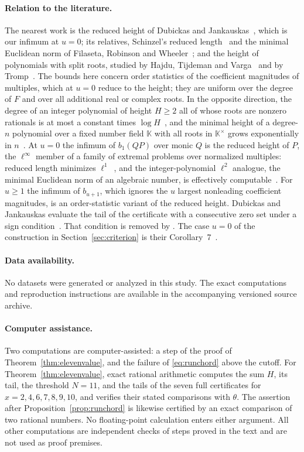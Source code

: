 \documentclass[11pt]{article}
\theoremstyle{definition}
\theoremstyle{plain}
\begin{document}
\paragraph{Relation to the literature.}  The nearest work is the reduced
height of Dubickas and Jankauskas~\cite{dj}, which is our infimum at $u=0$;
its relatives, Schinzel's reduced length~\cite{schinzel} and the minimal
Euclidean norm of Filaseta, Robinson and Wheeler~\cite{frw}; and the height
of polynomials with split roots, studied by Hajdu, Tijdeman and
Varga~\cite{htv} and by Tromp~\cite{tromp}.  The bounds here concern order
statistics of the coefficient magnitudes of multiples, which at $u=0$ reduce
to the height; they are uniform over the degree
of $F$ and over all additional real or complex roots.  In the opposite
direction, the degree of an integer polynomial of height $H\ge2$ all of whose
roots are nonzero rationals is at most a constant times $\log H$~\cite{htv},
and the minimal height of a degree-$n$ polynomial over a fixed number
field $\mathbb K$ with all roots in $\mathbb K^\times$ grows exponentially in
$n$~\cite{tromp}.  At $u=0$ the infimum of $b_1(QP)$ over monic $Q$ is the reduced height of $P$,
the $\ell^\infty$ member of a family
of extremal problems over normalized multiples: reduced length minimizes
$\ell^1$~\cite{schinzel}, and the integer-polynomial $\ell^2$ analogue, the
minimal Euclidean norm of an algebraic number, is effectively
computable~\cite{frw}.  For $u\ge1$ the infimum of $b_{u+1}$, which ignores
the $u$ largest nonleading coefficient magnitudes, is an order-statistic
variant of the reduced height.  Dubickas and Jankauskas evaluate the tail of
the certificate with a consecutive zero set under a sign
condition~\cite[p.~333]{dj}.  That condition is removed by
\cite[Lemma~2.1]{coefficient-mass}.  The case $u=0$ of the construction in
Section~\ref{sec:criterion} is their Corollary~7~\cite{dj}.
\par
\endgroup

\paragraph{Data availability.}
No datasets were generated or analyzed in this study.  The exact
computations and reproduction instructions are available in the accompanying
versioned source archive.

\paragraph{Computer assistance.}
Two computations are computer-assisted: a step of the proof of
Theorem~\ref{thm:elevenvalue}, and the failure of \eqref{eq:runchord} above
the cutoff.  For Theorem~\ref{thm:elevenvalue}, exact rational arithmetic
computes the sum $H$, its tail, the threshold $N=11$, and the tails of the
seven full certificates for $x=2,4,6,7,8,9,10$, and verifies their stated
comparisons with $\theta$.  The assertion after
Proposition~\ref{prop:runchord} is likewise certified by an exact comparison
of two rational numbers.  No floating-point calculation enters either
argument.  All other computations are independent checks of steps proved in
the text and are not used as proof premises.
\end{document}
